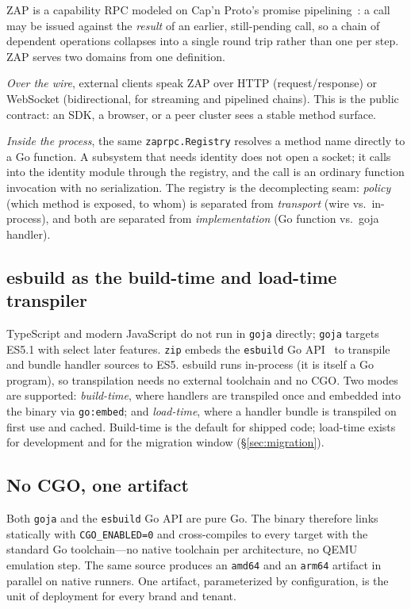 \documentclass[11pt]{article}
\begin{document}
ZAP is a capability RPC modeled on Cap'n Proto's promise
pipelining~\cite{capnproto}: a call may be issued against the
\emph{result} of an earlier, still-pending call, so a chain of dependent
operations collapses into a single round trip rather than one per step.
ZAP serves two domains from one definition.

\emph{Over the wire}, external clients speak ZAP over HTTP (request/response)
or WebSocket (bidirectional, for streaming and pipelined chains). This is
the public contract: an SDK, a browser, or a peer cluster sees a stable
method surface.

\emph{Inside the process}, the same \texttt{zaprpc.Registry} resolves a
method name directly to a Go function. A subsystem that needs identity does
not open a socket; it calls into the identity module through the registry,
and the call is an ordinary function invocation with no serialization. The
registry is the decomplecting seam: \emph{policy} (which method is exposed,
to whom) is separated from \emph{transport} (wire vs.\ in-process), and
both are separated from \emph{implementation} (Go function vs.\ goja
handler).

\subsection{esbuild as the build-time and load-time transpiler}

TypeScript and modern JavaScript do not run in \texttt{goja} directly;
\texttt{goja} targets ES5.1 with select later features. \texttt{zip}
embeds the \texttt{esbuild} Go API~\cite{esbuild} to transpile and bundle
handler sources to ES5. esbuild runs in-process (it is itself a Go
program), so transpilation needs no external toolchain and no CGO. Two
modes are supported: \emph{build-time}, where handlers are transpiled once
and embedded into the binary via \texttt{go:embed}; and \emph{load-time},
where a handler bundle is transpiled on first use and cached. Build-time is
the default for shipped code; load-time exists for development and for the
migration window (\S\ref{sec:migration}).

\subsection{No CGO, one artifact}

Both \texttt{goja} and the \texttt{esbuild} Go API are pure Go. The binary
therefore links statically with \texttt{CGO\_ENABLED=0} and cross-compiles
to every target with the standard Go toolchain---no native toolchain per
architecture, no QEMU emulation step. The same source produces an
\texttt{amd64} and an \texttt{arm64} artifact in parallel on native
runners. One artifact, parameterized by configuration, is the unit of
deployment for every brand and tenant.
\end{document}

